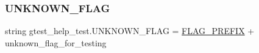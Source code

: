 \subsubsection{\texorpdfstring{UNKNOWN\_FLAG}{UNKNOWN\_FLAG}}
{\footnotesize\ttfamily string gtest\+\_\+help\+\_\+test.\+U\+N\+K\+N\+O\+W\+N\+\_\+\+F\+L\+AG = \mbox{\hyperlink{namespacegtest__help__test_a9e357a76dd993057c826ec411c9a4b3c}{F\+L\+A\+G\+\_\+\+P\+R\+E\+F\+IX}} + \textquotesingle{}unknown\+\_\+flag\+\_\+for\+\_\+testing\textquotesingle{}}

